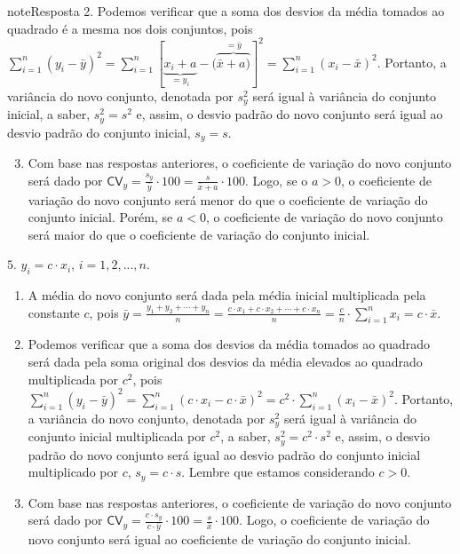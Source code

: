 \begin{sphinxadmonition}{note}{Resposta}
2. Podemos verificar que a soma dos desvios da média tomados ao quadrado é a mesma nos dois conjuntos, pois \(\displaystyle{\sum^n_{i=1}}(y_i-\bar{y})^2=\displaystyle{\sum^n_{i=1}}[\underbrace{x_i+a}_{=y_i}-(\overbrace{\bar{x}+a)}^{=\bar{y}}]^2=\displaystyle{\sum^n_{i=1}}(x_i-\bar{x})^2\).
Portanto, a variância do novo conjunto, denotada por \(s^2_y\) será igual à variância do conjunto inicial, a saber, \(s^2_y=s^2\) e, assim, o desvio padrão do novo conjunto será igual ao desvio padrão do conjunto inicial, \(s_y=s\).
\begin{enumerate}
\setcounter{enumi}{2}
\item {} 
Com base nas respostas anteriores, o coeficiente de variação do novo conjunto será dado por \(\textsf{CV}_y=\frac{s_y}{\bar{y}}\cdot 100=\frac{s}{\bar{x}+a}\cdot 100\). Logo, se o \(a>0\), o coeficiente de variação do novo conjunto será menor do que o coeficiente de variação do conjunto inicial. Porém, se \(a<0\), o coeficiente de variação do novo conjunto será maior do que o coeficiente de variação do conjunto inicial.

\end{enumerate}

\(5.\) \(y_i=c\cdot x_i\), \(i=1,2,...,n\).
\begin{enumerate}
\item {} 
A média do novo conjunto será dada pela média inicial multiplicada pela constante \(c\), pois \(\bar{y}=\frac{y_1+y_2+\cdots +y_n}{n}=\frac{c\cdot x_1+c\cdot x_2+\cdots+c\cdot x_n}{n}=\frac{c}{n}\cdot \displaystyle{\sum^n_{i=1}}x_i =c\cdot\bar{x}\).

\item {} 
Podemos verificar que a soma dos desvios da média tomados ao quadrado será dada pela soma original dos desvios da média elevados ao quadrado multiplicada por \(c^2\), pois \(\displaystyle{\sum^n_{i=1}}(y_i-\bar{y})^2=\displaystyle{\sum^n_{i=1}}(c\cdot x_i-c\cdot \bar{x})^2=c^2\cdot \displaystyle{\sum^n_{i=1}}(x_i-\bar{x})^2\).    Portanto, a variância do novo conjunto, denotada por \(s^2_y\) será igual à variância do conjunto inicial multiplicada por \(c^2\), a saber, \(s^2_y=c^2\cdot s^2\) e, assim, o desvio padrão do novo conjunto será igual ao desvio padrão do conjunto inicial multiplicado por \(c\), \(s_y=c\cdot s\). Lembre que estamos considerando \(c>0\).

\item {} 
Com base nas respostas anteriores, o coeficiente de variação do novo conjunto será dado por \(\textsf{CV}_y=\frac{c\cdot s_y}{c\cdot \bar{y}}\cdot 100=\frac{s}{\bar{x}}\cdot 100\). Logo, o coeficiente de variação do novo conjunto será igual ao coeficiente de variação do conjunto inicial.


\end{enumerate}
\end{sphinxadmonition}
